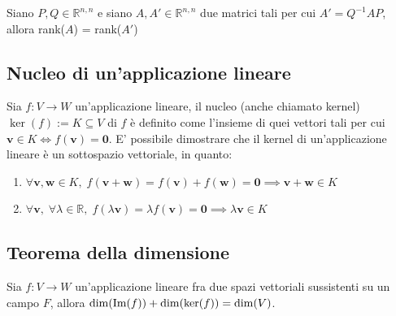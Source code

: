     \begin{corollary}
        Siano $P, Q \in \mathbb{R}^{n, n}$ e siano $A, A' \in \mathbb{R}^{n, n}$ due matrici tali per cui $A' = Q^{-1}AP$, allora rank($A$) = rank($A'$)
    \end{corollary}



\vspace{10pt}
\subsection{Nucleo di un'applicazione lineare} \label{subsec:linappkernel}
    Sia $f: V \rightarrow W$ un'applicazione lineare, il nucleo (anche chiamato kernel) $\ker(f) := K \subseteq V$ di $f$ è definito come l'insieme di quei vettori tali per cui $\mathbf{v} \in K \iff f(\mathbf{v}) = \mathbf{0}$.
    E' possibile dimostrare che il kernel di un'applicazione lineare è un sottospazio vettoriale, in quanto:

    \begin{enumerate}[label=(\arabic*)]
        \item $\forall \mathbf{v}, \mathbf{w} \in K, \; f(\mathbf{v} + \mathbf{w}) = f(\mathbf{v}) + f(\mathbf{w}) = \mathbf{0} \implies \mathbf{v} + \mathbf{w} \in K$
        \item $\forall \mathbf{v}, \; \forall \lambda \in \mathbb{R}, \; f(\lambda \mathbf{v}) = \lambda f(\mathbf{v}) = \mathbf{0} \implies \lambda \mathbf{v} \in K$
    \end{enumerate}



\vspace{10pt}
\subsection{Teorema della dimensione} \label{subsec:linappdimtheorem}
    \begin{theorem} \label{thm:dimension}
        Sia $f : V \rightarrow W$ un'applicazione lineare fra due spazi vettoriali sussistenti su un campo $F$, allora $\dim(\textnormal{Im}(f)) + \dim(\ker(f)) = \dim(V)$.
    \end{theorem}

